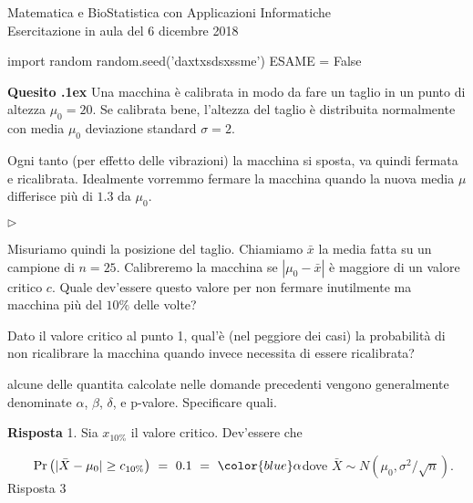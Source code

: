 \documentclass[11pt,twoside,a4paper]{article}
\newcommand{\mylabel}[1]{#1\hfill}
\renewenvironment{itemize}
  {\begin{list}{$\triangleright$}{%
   \setlength{\parskip}{0mm}
   \setlength{\topsep}{.4\baselineskip}
   \setlength{\rightmargin}{0mm}
   \setlength{\listparindent}{0mm}
   \setlength{\itemindent}{0mm}
   \setlength{\labelwidth}{2ex}
   \setlength{\itemsep}{.4\baselineskip}
   \setlength{\parsep}{0mm}
   \setlength{\partopsep}{0mm}
   \setlength{\labelsep}{1ex}
   \setlength{\leftmargin}{\labelwidth+\labelsep}
   \let\makelabel\mylabel}}{%
   \end{list}\vspace*{-1.3mm}}
\newcounter{quesito}
\newenvironment{question}{\addtocounter{quesito}{1}\par\textbf{Quesito \thequesito.\kern1ex}}{\vspace{0.5\parskip}}
\newenvironment{answer}{\par\textbf{Risposta\quad}}{\vspace{\parskip}}
\begin{document}
\colorbox{blue!10}{\begin{minipage}{\textwidth}
Matematica e BioStatistica con Applicazioni Informatiche\\
Esercitazione in aula del 6 dicembre 2018
\end{minipage}}



\begin{pycode}
import random
random.seed('daxtxsdsxssme')
ESAME = False
\end{pycode}


\bigskip\bigskip
\begin{question}
Una macchina è calibrata in modo da fare un taglio in un punto di altezza $\mu_0=20$. Se calibrata bene, l'altezza del taglio è distribuita normalmente con media $\mu_0$ deviazione standard $\sigma=2$. 

Ogni tanto (per effetto delle vibrazioni) la macchina si sposta, va quindi fermata e ricalibrata. Idealmente vorremmo fermare la macchina quando la nuova media $\mu$ differisce più di $1.3$ da $\mu_0$.

\begin{itemize}
\item[1.] Misuriamo quindi la posizione del taglio. Chiamiamo $\bar x$ la media fatta su un campione di $n=25$. Calibreremo la macchina se $|\mu_0-\bar x|$ è maggiore di un valore critico $c$. Quale dev'essere questo valore per non fermare inutilmente ma macchina più del $10\%$ delle volte?

\item[2.] Dato il valore critico al punto 1, qual'è (nel peggiore dei casi) la probabilità di non ricalibrare la macchina quando invece necessita di essere ricalibrata?


\item[4] alcune delle quantita calcolate nelle domande precedenti vengono generalmente denominate $\alpha$, $\beta$, $\delta$, e p-valore. Specificare quali.
\end{itemize}
\begin{answer}
1. Sia $x_{10\%}$ il valore critico. Dev'essere che 

$\qquad\Pr\big(|\bar X-\mu_0|\ge c_{10\%}\big)\ =\ 0.1\ =\ {\color{blue}\alpha}$\hfill dove $\bar X\sim N(\mu_0, \sigma^2/\sqrt{n})$.\hfill{\color{blue} Risposta 3} 


\end{answer}
\end{question}
\end{document}
